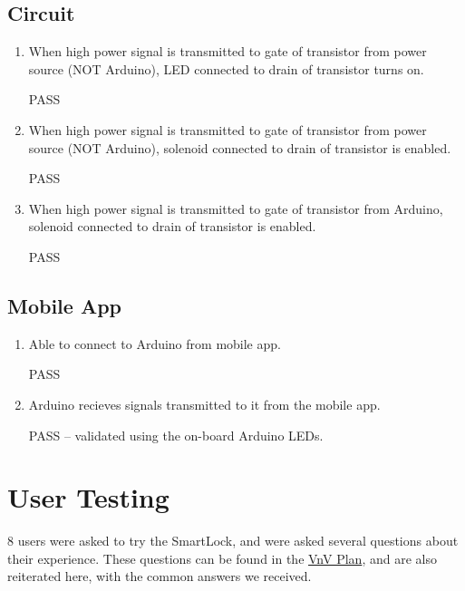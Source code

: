 \documentclass[12pt, titlepage]{article}
\begin{document}
\subsection{Circuit}
\begin{enumerate}
    \item When high power signal is transmitted to gate of transistor from power source (NOT Arduino), LED connected to drain of transistor turns on.

    PASS
    \item When high power signal is transmitted to gate of transistor from power source (NOT Arduino), solenoid connected to drain of transistor is enabled.

    PASS
    \item When high power signal is transmitted to gate of transistor from Arduino, solenoid connected to drain of transistor is enabled.

    PASS
\end{enumerate}

\subsection{Mobile App}
\begin{enumerate}
    \item Able to connect to Arduino from mobile app.

    PASS
    \item Arduino recieves signals transmitted to it from the mobile app.

    PASS -- validated using the on-board Arduino LEDs.
\end{enumerate}

\section{User Testing}
\label{User Testing}

8 users were asked to try the SmartLock, and were asked several questions about their experience. These questions can be found in the \href{https://github.com/NevoAbigail/Capstone/blob/main/docs/VnVPlan/VnVPlan.pdf}{VnV Plan}, and are also reiterated here, with the common answers we received.
\end{document}
